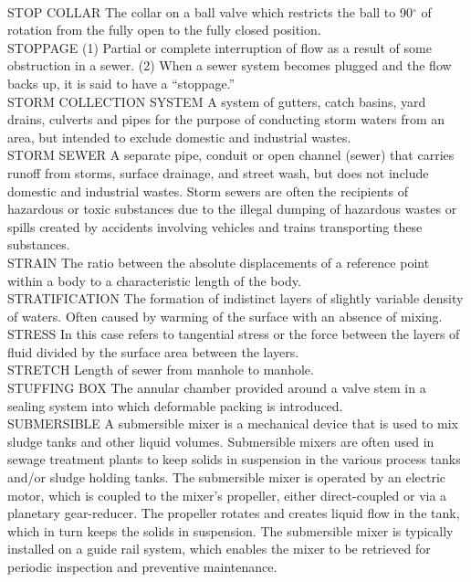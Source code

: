 \documentclass{article}
\begin{document}
\vspace{0.3cm}\\
STOP COLLAR
The collar on a ball valve which restricts the ball to 90$^{\circ}$ of rotation from the fully open to the fully closed position.
\vspace{0.3cm}\\
STOPPAGE
(1) Partial or complete interruption of flow as a result of some obstruction in a sewer. (2) When a sewer system becomes plugged and the flow backs up, it is said to have a “stoppage.” 
\vspace{0.3cm}\\
STORM COLLECTION SYSTEM
A system of gutters, catch basins, yard drains, culverts and pipes for the purpose of conducting storm waters from an area, but intended to exclude domestic and industrial wastes. 
\vspace{0.3cm}\\
STORM SEWER
A separate pipe, conduit or open channel (sewer) that carries runoff from storms, surface drainage, and street wash, but does not include domestic and industrial wastes. Storm sewers are often the recipients of hazardous or toxic substances due to the illegal dumping of hazardous wastes or spills created by accidents involving vehicles and trains transporting these substances. 
\vspace{0.3cm}\\
STRAIN
The ratio between the absolute displacements of a reference point within a body to a characteristic length of the body.
\vspace{0.3cm}\\
STRATIFICATION
The formation of indistinct layers of slightly variable density of waters. Often caused by warming of the surface with an absence of mixing.
\vspace{0.3cm}\\
STRESS
In this case refers to tangential stress or the force between the layers of fluid divided by the surface area between the layers.
\vspace{0.3cm}\\
STRETCH
Length of sewer from manhole to manhole.
\vspace{0.3cm}\\
STUFFING BOX
The annular chamber provided around a valve stem in a sealing system into which deformable packing is introduced.
\vspace{0.3cm}\\
SUBMERSIBLE
A submersible mixer is a mechanical device that is used to mix sludge tanks and other liquid volumes. Submersible mixers are often used in sewage treatment plants to keep solids in suspension in the various process tanks and/or sludge holding tanks. The submersible mixer is operated by an electric motor, which is coupled to the mixer’s propeller, either direct-coupled or via a planetary gear-reducer. The propeller rotates and creates liquid flow in the tank, which in turn keeps the solids in suspension. The submersible mixer is typically installed on a guide rail system, which enables the mixer to be retrieved for periodic inspection and preventive maintenance.
\end{document}
